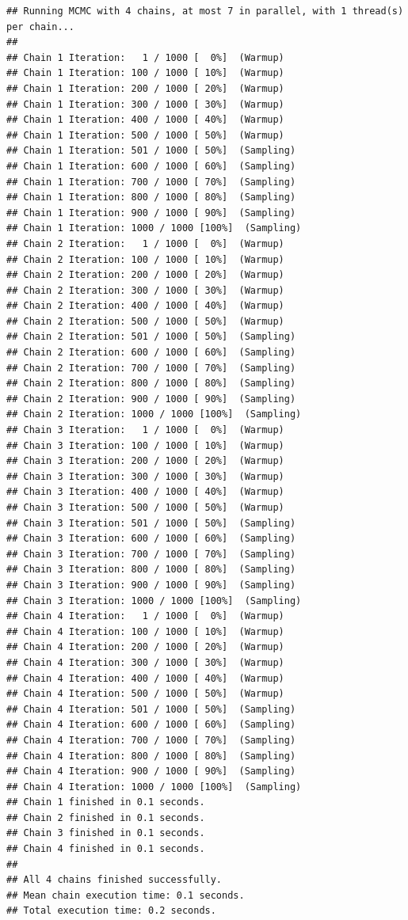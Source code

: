 \documentclass[
]{article}
\begin{document}
\begin{verbatim}
## Running MCMC with 4 chains, at most 7 in parallel, with 1 thread(s) per chain...
## 
## Chain 1 Iteration:   1 / 1000 [  0%]  (Warmup) 
## Chain 1 Iteration: 100 / 1000 [ 10%]  (Warmup) 
## Chain 1 Iteration: 200 / 1000 [ 20%]  (Warmup) 
## Chain 1 Iteration: 300 / 1000 [ 30%]  (Warmup) 
## Chain 1 Iteration: 400 / 1000 [ 40%]  (Warmup) 
## Chain 1 Iteration: 500 / 1000 [ 50%]  (Warmup) 
## Chain 1 Iteration: 501 / 1000 [ 50%]  (Sampling) 
## Chain 1 Iteration: 600 / 1000 [ 60%]  (Sampling) 
## Chain 1 Iteration: 700 / 1000 [ 70%]  (Sampling) 
## Chain 1 Iteration: 800 / 1000 [ 80%]  (Sampling) 
## Chain 1 Iteration: 900 / 1000 [ 90%]  (Sampling) 
## Chain 1 Iteration: 1000 / 1000 [100%]  (Sampling) 
## Chain 2 Iteration:   1 / 1000 [  0%]  (Warmup) 
## Chain 2 Iteration: 100 / 1000 [ 10%]  (Warmup) 
## Chain 2 Iteration: 200 / 1000 [ 20%]  (Warmup) 
## Chain 2 Iteration: 300 / 1000 [ 30%]  (Warmup) 
## Chain 2 Iteration: 400 / 1000 [ 40%]  (Warmup) 
## Chain 2 Iteration: 500 / 1000 [ 50%]  (Warmup) 
## Chain 2 Iteration: 501 / 1000 [ 50%]  (Sampling) 
## Chain 2 Iteration: 600 / 1000 [ 60%]  (Sampling) 
## Chain 2 Iteration: 700 / 1000 [ 70%]  (Sampling) 
## Chain 2 Iteration: 800 / 1000 [ 80%]  (Sampling) 
## Chain 2 Iteration: 900 / 1000 [ 90%]  (Sampling) 
## Chain 2 Iteration: 1000 / 1000 [100%]  (Sampling) 
## Chain 3 Iteration:   1 / 1000 [  0%]  (Warmup) 
## Chain 3 Iteration: 100 / 1000 [ 10%]  (Warmup) 
## Chain 3 Iteration: 200 / 1000 [ 20%]  (Warmup) 
## Chain 3 Iteration: 300 / 1000 [ 30%]  (Warmup) 
## Chain 3 Iteration: 400 / 1000 [ 40%]  (Warmup) 
## Chain 3 Iteration: 500 / 1000 [ 50%]  (Warmup) 
## Chain 3 Iteration: 501 / 1000 [ 50%]  (Sampling) 
## Chain 3 Iteration: 600 / 1000 [ 60%]  (Sampling) 
## Chain 3 Iteration: 700 / 1000 [ 70%]  (Sampling) 
## Chain 3 Iteration: 800 / 1000 [ 80%]  (Sampling) 
## Chain 3 Iteration: 900 / 1000 [ 90%]  (Sampling) 
## Chain 3 Iteration: 1000 / 1000 [100%]  (Sampling) 
## Chain 4 Iteration:   1 / 1000 [  0%]  (Warmup) 
## Chain 4 Iteration: 100 / 1000 [ 10%]  (Warmup) 
## Chain 4 Iteration: 200 / 1000 [ 20%]  (Warmup) 
## Chain 4 Iteration: 300 / 1000 [ 30%]  (Warmup) 
## Chain 4 Iteration: 400 / 1000 [ 40%]  (Warmup) 
## Chain 4 Iteration: 500 / 1000 [ 50%]  (Warmup) 
## Chain 4 Iteration: 501 / 1000 [ 50%]  (Sampling) 
## Chain 4 Iteration: 600 / 1000 [ 60%]  (Sampling) 
## Chain 4 Iteration: 700 / 1000 [ 70%]  (Sampling) 
## Chain 4 Iteration: 800 / 1000 [ 80%]  (Sampling) 
## Chain 4 Iteration: 900 / 1000 [ 90%]  (Sampling) 
## Chain 4 Iteration: 1000 / 1000 [100%]  (Sampling) 
## Chain 1 finished in 0.1 seconds.
## Chain 2 finished in 0.1 seconds.
## Chain 3 finished in 0.1 seconds.
## Chain 4 finished in 0.1 seconds.
## 
## All 4 chains finished successfully.
## Mean chain execution time: 0.1 seconds.
## Total execution time: 0.2 seconds.
\end{verbatim}
\end{document}
